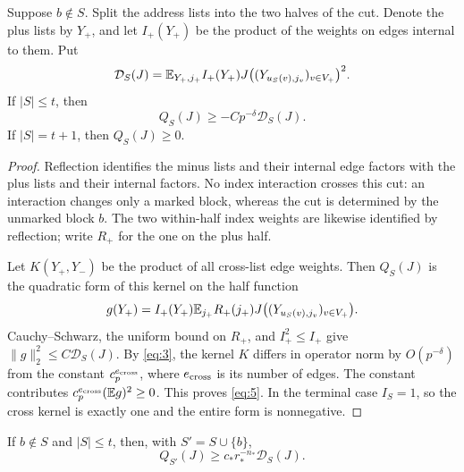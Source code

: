 \begin{lemma}
\label{tuple:unmarked-defect}
Suppose $b\notin S$.  Split the address lists into the two halves of
the cut.  Denote the plus lists by $Y_+$, and let $I_+(Y_+)$ be the
product of the weights on edges internal to them.  Put
\[
 \mathcal D_S(J)=\mathbb E_{Y_+,j_+} I_+(Y_+)
       J\bigl((Y_{u_S(v),j_v})_{v\in V_+}\bigr)^2.
\]
If $|S|\le t$, then
\begin{equation}
 Q_S(J)\ge-Cp^{-\delta}\mathcal D_S(J).
 \label{eq:5}
\end{equation}
If $|S|=t+1$, then $Q_S(J)\ge0$.
\end{lemma}

\begin{proof}
Reflection identifies the minus lists and their internal edge factors
with the plus lists and their internal factors.  No index interaction
crosses this cut: an interaction changes only a marked block, whereas
the cut is determined by the unmarked block $b$.  The two within-half
index weights are likewise identified by reflection; write $R_+$
for the one on the plus half.

Let $K(Y_+,Y_-)$ be the product of all cross-list edge weights.  Then
$Q_S(J)$ is the quadratic form of this kernel on the half function
\[
 g(Y_+)=I_+(Y_+)\mathbb E_{j_+}
       R_+(j_+)J\bigl((Y_{u_S(v),j_v})_{v\in V_+}\bigr).
\]
Cauchy--Schwarz, the uniform bound on $R_+$, and $I_+^2\le I_+$ give
$\|g\|_2^2\le C\mathcal D_S(J)$.  By \eqref{eq:3}, the kernel
$K$ differs in operator norm by $O(p^{-\delta})$ from the constant
$c_p^{e_{\rm cross}}$, where $e_{\rm cross}$ is its number of edges.
The constant contributes $c_p^{e_{\rm cross}}(\mathbb E g)^2\ge0$.
This proves \eqref{eq:5}.  In the terminal case $I_S=1$, so the
cross kernel is exactly one and the entire form is nonnegative.
\end{proof}

\begin{lemma}
\label{tuple:marking-domination}
If $b\notin S$ and $|S|\le t$, then, with $S'=S\cup\{b\}$,
\begin{equation}
 Q_{S'}(J)\ge c_*r_*^{-n_*}\mathcal D_S(J).
 \label{eq:6}
\end{equation}
\end{lemma}

